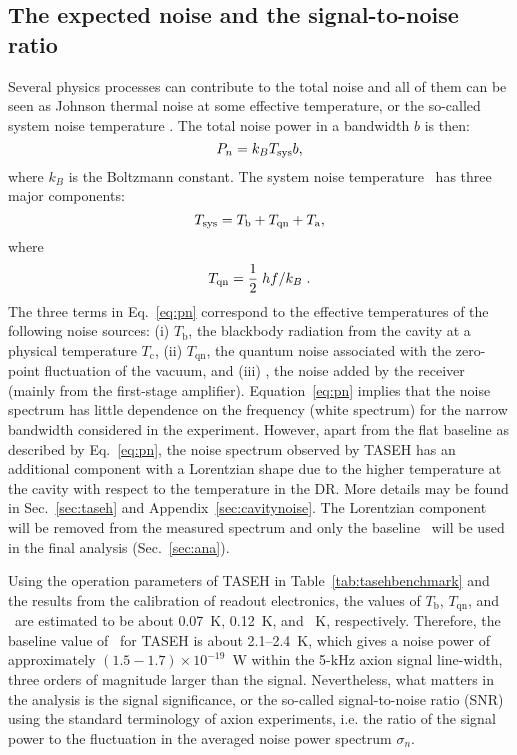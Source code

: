 \subsection{The expected noise and the signal-to-noise ratio}
\label{sec:intronoise}
Several physics processes can contribute to the total noise and all of them 
can be seen as Johnson thermal noise at some effective temperature, or the 
so-called system noise temperature \tsys. The total noise power in a 
bandwidth $b$ is then:
\begin{equation}
  P_n = k_BT_\text{sys} b, 
\end{equation}
where $k_B$ is the Boltzmann constant. 
The system noise temperature \tsys\ has three major components: 
\begin{equation}
  T_\text{sys} = T_\text{b} + T_\text{qn}  + T_\text{a},
\label{eq:pn}
\end{equation}
where 
\begin{equation}
   T_\text{qn} = \frac{1}{2}\left. hf\middle/k_B\right..
\end{equation}
 The three terms in Eq.~\eqref{eq:pn} correspond to the effective 
temperatures of the following noise sources: (i) $T_\text{b}$, the blackbody 
radiation from the cavity at a physical temperature $T_\mathrm{c}$, (ii) 
$T_\text{qn}$, the quantum noise 
associated with the zero-point fluctuation of the vacuum, and (iii) \ta, the 
noise added by the receiver (mainly from the first-stage amplifier). 
Equation~\eqref{eq:pn} implies 
that the noise spectrum has little dependence on the frequency 
(white spectrum) for the narrow bandwidth considered in the experiment. 
However, apart from the flat baseline as described by 
Eq.~\eqref{eq:pn}, the noise spectrum observed by TASEH has an additional 
component with a Lorentzian shape due to the higher temperature at the 
cavity with respect to the temperature in the DR. More details may be 
found in Sec.~\ref{sec:taseh} and Appendix~\ref{sec:cavitynoise}. The 
Lorentzian component will be removed from the measured spectrum and only 
the baseline \tsys\ will be used in the final analysis (Sec.~\ref{sec:ana}). 

Using the operation parameters of TASEH in Table~\ref{tab:tasehbenchmark} and 
the results from the calibration of readout electronics, 
the values of $T_\text{b}$, $T_\text{qn}$, and \ta\ are estimated to be about 
0.07~K, 0.12~K, and \noise~K, respectively.  
Therefore, the baseline value of \tsys\ for TASEH 
is about 2.1--2.4~K, which gives a noise power of approximately 
$\left(1.5-1.7\right)\times 10^{-19}$~W within the 5-kHz axion signal 
line-width, three 
orders of magnitude larger than the signal. Nevertheless, what matters in the 
analysis is the signal significance, or the so-called signal-to-noise ratio 
(SNR) using the standard terminology of axion experiments, i.e. the ratio of 
the signal power to the fluctuation in the averaged noise power spectrum 
$\sigma_n$. 

